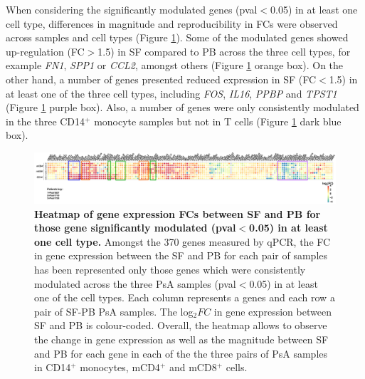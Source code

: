 When considering the significantly modulated genes (pval$<$0.05) in at least one cell type, 
differences in magnitude and reproducibility in FCs were observed across samples and cell types (Figure \ref{figure:PSA_PCR_array_5pcnt_heatmap}). Some of the modulated genes showed up-regulation (FC$>$1.5) in SF compared to PB across the three cell types, for example \textit{FN1}, \textit{SPP1} or \textit{CCL2}, amongst others (Figure \ref{figure:PSA_PCR_array_5pcnt_heatmap} orange box). On the other hand, a number of genes presented reduced expression in SF (FC$<$1.5) in at least one of the three cell types, including \textit{FOS}, \textit{IL16}, \textit{PPBP} and \textit{TPST1} (Figure \ref{figure:PSA_PCR_array_5pcnt_heatmap} purple box). Also, a number of genes were only consistently modulated in the three CD14$^+$ monocyte samples but not in T cells (Figure \ref{figure:PSA_PCR_array_5pcnt_heatmap} dark blue box). 

\begin{landscape}
\begin{figure}[H]
\centering
\includegraphics[width=1.5\textwidth]{./Results3/pdfs/PCR_array_PSA_SF_vs_PB_filtered_5_percent_genes_heatmap_New}
\caption[Heatmap of gene expression FCs between SF and PB for those gene significantly modulated (pval$<$0.05) in at least one cell type.]{\textbf{Heatmap of gene expression FCs between SF and PB for those gene significantly modulated (pval$<$0.05) in at least one cell type.} Amongst the 370 genes measured by qPCR, the FC in gene expression between the SF and PB for each pair of samples has been represented only those genes which were consistently modulated across the three PsA samples (pval$<$0.05) in at least one of the cell types. Each column represents a genes and each row a pair of SF-PB PsA samples. The log${_2}FC$ in gene expression between SF and PB is colour-coded. Overall, the heatmap allows to observe the change in gene expression as well as the magnitude between SF and PB for each gene in each of the the three pairs of PsA samples in CD14$^+$ monocytes, mCD4$^+$ and mCD8$^+$ cells.}
\label{figure:PSA_PCR_array_5pcnt_heatmap}
\end{figure}
\end{landscape}

